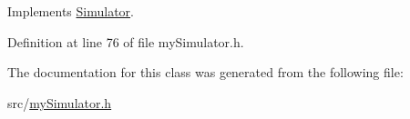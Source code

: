 Implements \mbox{\hyperlink{class_simulator_a78e300570318b9cd65f52b9547dee070}{Simulator}}.



Definition at line 76 of file my\+Simulator.\+h.


\begin{DoxyCode}{0}

\end{DoxyCode}


The documentation for this class was generated from the following file\+:\begin{DoxyCompactItemize}
\item 
src/\mbox{\hyperlink{my_simulator_8h}{my\+Simulator.\+h}}\end{DoxyCompactItemize}

